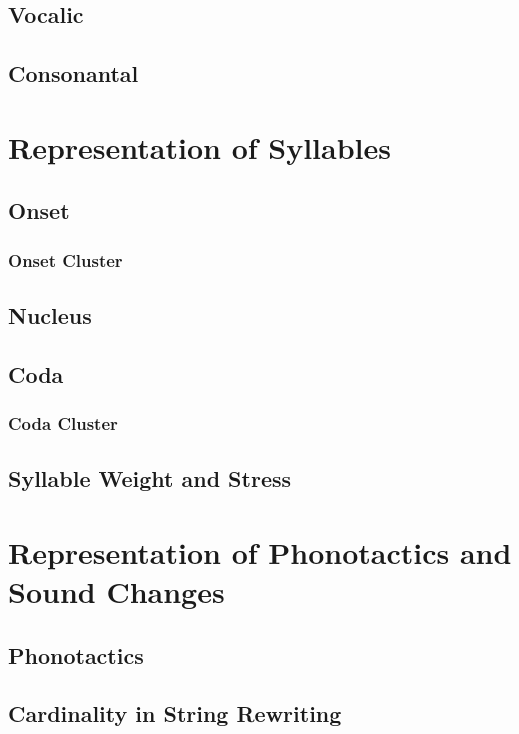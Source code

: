 \documentclass{report}
\begin{document}
\section{Vocalic}

\section{Consonantal}

\chapter{Representation of Syllables}

\section{Onset}

\subsection{Onset Cluster}

\section{Nucleus}

\section{Coda}

\subsection{Coda Cluster}

\section{Syllable Weight and Stress}

\chapter{Representation of Phonotactics and Sound Changes}

\section{Phonotactics}

\section{Cardinality in String Rewriting}
\end{document}

